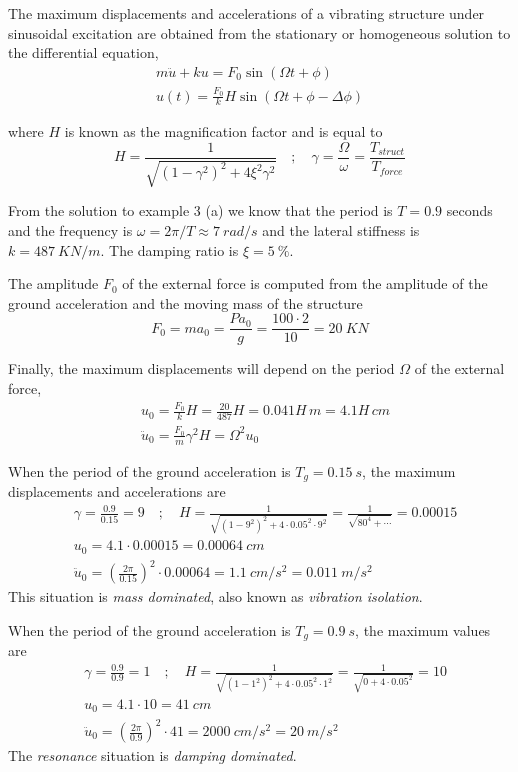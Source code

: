\begin{Answer}[ref={frame_ground_acceleration}]
The maximum displacements and accelerations of a vibrating structure under sinusoidal excitation are obtained from the stationary or homogeneous solution to the differential equation,
\begin{align*}
m\ddot{u} + ku = F_0\sin(\Omega t + \phi) \\
u(t) = \frac{F_0}{k}H\sin(\Omega t + \phi - \Delta\phi)
\end{align*}

where $H$ is known as the magnification factor and is equal to
$$
H = \frac{1}{\sqrt{(1-\gamma^2)^2 + 4\xi^2\gamma^2}} \quad ; \quad
\gamma = \frac{\Omega}{\omega} = \frac{T_{struct}}{T_{force}}
$$

From the solution to example 3 (a) we know that the period is $T=0.9$ seconds and the frequency is $\omega = 2\pi/T \approx \SI{7}{rad/s}$ and the lateral stiffness is $k=\SI{487}{KN/m}$. The damping ratio is $\xi=\SI{5}{\%}$.

The amplitude $F_0$ of the external force is computed from the amplitude of the ground acceleration and the moving mass of the structure
$$
F_0 = ma_{0} = \frac{Pa_0}{g} = \frac{100\cdot2}{10} = \qty{20}{KN}
$$

Finally, the maximum displacements will depend on the period $\Omega$ of the external force,
\begin{align*}
&u_0 = \frac{F_0}{k}H = \frac{20}{487}H = 0.041H\,\si{m} = 4.1H\,\si{cm} \\
&\ddot{u}_0 = \frac{F_0}{m}\gamma^2H = \Omega^2u_0
\end{align*}


When the period of the ground acceleration is $T_g=\SI{0.15}{s}$, the maximum displacements and accelerations are
\begin{align*}
&\gamma = \frac{0.9}{0.15} = 9 \quad ; \quad
H = \frac{1}{\sqrt{(1-9^2)^2 + 4\cdot 0.05^2\cdot 9^2}} = \frac{1}{\sqrt{80^4 + \cdots}} = 0.00015 \\
&u_0 = 4.1\cdot 0.00015 = \SI{0.00064}{cm} \\
&\ddot{u}_0 = \left(\frac{2\pi}{0.15}\right)^2 \cdot 0.00064 = \SI{1.1}{cm/s^2} = \SI{0.011}{m/s^2}
\end{align*}
This situation is \emph{mass dominated}, also known as \emph{vibration isolation}.

When the period of the ground acceleration is $T_g=\SI{0.9}{s}$, the maximum values are
\begin{align*}
&\gamma = \frac{0.9}{0.9} = 1 \quad ; \quad
H = \frac{1}{\sqrt{(1-1^2)^2 + 4\cdot 0.05^2\cdot 1^2}} = \frac{1}{\sqrt{0 + 4\cdot 0.05^2}} = 10 \\
&u_0 = 4.1\cdot 10 = \SI{41}{cm} \\
&\ddot{u}_0 = \left(\frac{2\pi}{0.9}\right)^2 \cdot 41 = \SI{2000}{cm/s^2} = \SI{20}{m/s^2}
\end{align*}
The \emph{resonance} situation is \emph{damping dominated}.


\end{Answer}
